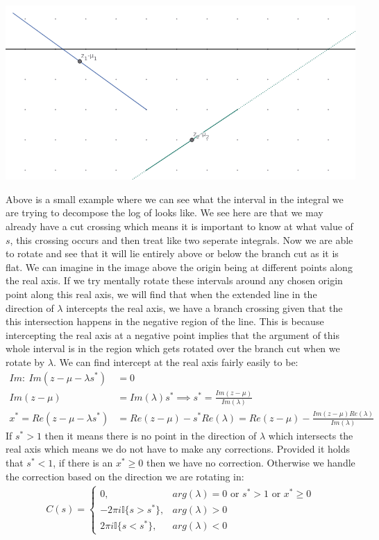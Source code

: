 \documentclass{article}
\begin{document}
\includegraphics[width=\textwidth]{intervaltransform}

Above is a small example where we can see what the interval in the integral we are trying to decompose the log of looks like.
We see here are that we may already have a cut crossing which means it is important to know at what value of $s$, this crossing occurs and then treat like two seperate integrals.
Now we are able to rotate and see that it will lie entirely above or below the branch cut as it is flat.
We can imagine in the image above the origin being at different points along the real axis.
If we try mentally rotate these intervals around any chosen origin point along this real axis, we will find that when the extended line in the direction of $\lambda$ intercepts the real axis, we have a branch crossing given that the this intersection happens in the negative region of the line.
This is because intercepting the real axis at a negative point implies that the argument of this whole interval is in the region which gets rotated over the branch cut when we rotate by $\lambda$.
We can find intercept at the real axis fairly easily to be:
\begin{align}
    Im:\:Im(z-\mu-\lambda s^*)&=0\\
    Im(z-\mu)&=Im(\lambda)s^*\implies s^*=\frac{Im(z-\mu)}{Im(\lambda)}\\
    x^*=Re(z-\mu-\lambda s^*)&=Re(z-\mu)-s^*Re(\lambda)=Re(z-\mu)-\frac{Im(z-\mu)Re(\lambda)}{Im(\lambda)}
\end{align}
If $s^*>1$ then it means there is no point in the direction of $\lambda$ which intersects the real axis which means we do not have to make any corrections.
Provided it holds that $s^*<1$, if there is an $x^*\geq 0$ then we have no correction.
Otherwise we handle the correction based on the direction we are rotating in:
\begin{align}
    C(s)=\begin{cases}
	0,&arg(\lambda)=0\text{ or }s^*>1\text{ or }x^*\geq 0\\
	-2\pi i\mathbb{I}\{s>s^*\},&arg(\lambda)>0\\
	2\pi i\mathbb{I}\{s<s^*\},&arg(\lambda)<0
    \end{cases}
\end{align}
\end{document}
